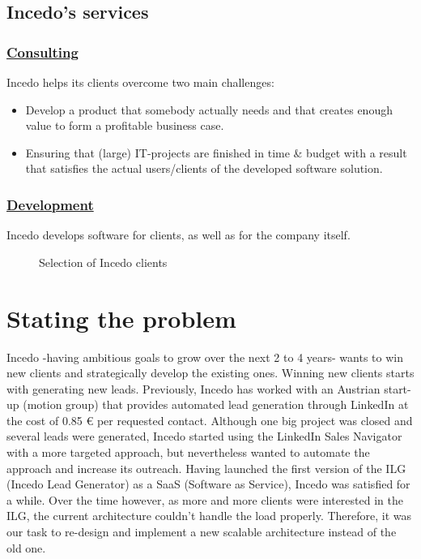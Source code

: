 \subsection{Incedo's services}
\subsubsection*{\underline{Consulting}}
Incedo helps its clients overcome two main challenges:
\begin{itemize}
    \item Develop a product that somebody actually needs and that creates enough value to form a profitable business case.
    \item Ensuring that (large) IT-projects are finished in time \& budget with a result that satisfies the actual users/clients of the developed software solution.
\end{itemize}

\subsubsection*{\underline{Development}}
Incedo develops software for clients, as well as for the company itself.
\begin{figure}[H]
    \centering
    \caption{Selection of Incedo clients}
    \label{fig:selection-of-incedo-clients}
\end{figure}

\section{Stating the problem}
Incedo -having ambitious goals to grow over the next 2 to 4 years- wants to win new clients and strategically develop the existing ones. Winning new clients starts with generating new leads. Previously, Incedo has worked with an Austrian start-up (motion group) that provides automated lead generation through LinkedIn at the cost of 0.85 € per requested contact. Although one big project was closed and several leads were generated, Incedo started using the LinkedIn Sales Navigator with a more targeted approach, but nevertheless wanted to automate the approach and increase its outreach.
Having launched the first version of the ILG (Incedo Lead Generator) as a SaaS (Software as Service), Incedo was satisfied for a while. Over the time however, as more and more clients were interested in the ILG, the current architecture couldn’t handle the load properly. Therefore, it was our task to re-design and implement a new scalable architecture instead of the old one.

